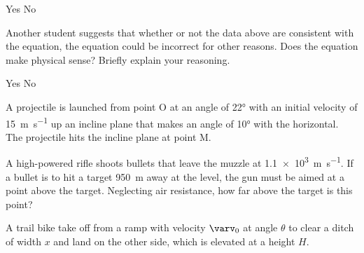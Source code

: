\documentclass{../../../oss-ap12ibhl}
\begin{document}
\begin{questions}
\begin{parts}
\begin{subparts}
      \vspace{.1in}
      \underline{\hspace{.25in}} Yes\hspace{.5in}
      \underline{\hspace{.25in}} No

      \vspace{.1in}

      \subpart Another student suggests that whether or not the data above are
      consistent with the equation, the equation could be incorrect for other
      reasons. Does the equation make physical sense? Briefly explain your
      reasoning.

      \vspace{.1in}
      \underline{\hspace{.25in}} Yes\hspace{.5in}
      \underline{\hspace{.25in}} No
    
      \vspace{.1in}
    \end{subparts}
  \end{parts}
  \newpage
  
  
  \question A projectile is launched from point O at an angle of \ang{22} with
  an initial velocity of \SI{15}{\metre\per\second} up an incline plane that
  makes an angle of \ang{10} with the horizontal. The projectile hits the
  incline plane at point M.
  \newpage
  
  \question A high-powered rifle shoots bullets that leave the muzzle at
  \SI{1.1e3}{\metre\per\second}. If a bullet is to hit a target
  \SI{950}{\metre} away at the level, the gun must be aimed at a point above
  the target. Neglecting air resistance, how far above the target is this
  point?
  \newpage

  \question A trail bike take off from a ramp with velocity $\bm{\varv}_0$ at
  angle $\theta$ to clear a ditch of width $x$ and land on the other side,
  which is elevated at a height $H$.
  \begin{parts}

\end{parts}
\end{questions}
\end{document}
